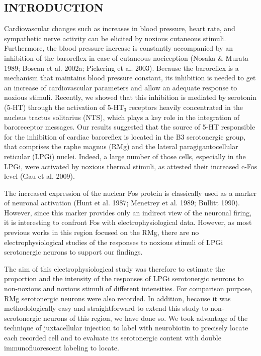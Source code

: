 \documentclass[a4paper,12pt,twoside]{report}
\begin{document}
\vfill

\cleardoublepage

\subsection{INTRODUCTION}

Cardiovascular changes such as increases in blood pressure, heart rate, and sympathetic nerve activity can be elicited by noxious cutaneous stimuli. Furthermore, the blood pressure increase is constantly accompanied by an inhibition of the baroreflex in case of cutaneous nociception (Nosaka \& Murata 1989; Boscan et al. 2002a; Pickering et al. 2003). Because the baroreflex is a mechanism that maintains blood pressure constant, its inhibition is needed to get an increase of cardiovascular parameters and allow an adequate response to noxious stimuli. Recently, we showed that this inhibition is mediated by serotonin (5-HT) through the activation of 5-HT$_{3}$ receptors heavily concentrated in the nucleus tractus solitarius (NTS), which plays a key role in the integration of baroreceptor messages. Our results suggested that the source of 5-HT responsible for the inhibition of cardiac baroreflex is located in the B3 serotonergic group, that comprises the raphe magnus (RMg) and the lateral paragigantocellular reticular (LPGi) nuclei. Indeed, a large number of those cells, especially in the LPGi, were activated by noxious thermal stimuli, as attested their increased c-Fos level (Gau et al. 2009).

The increased expression of the nuclear Fos protein is classically used as a marker of neuronal activation (Hunt et al. 1987; Menetrey et al. 1989; Bullitt 1990). However, since this marker provides only an indirect view of the neuronal firing, it is interesting to confront Fos with electrophysiological data. However, as most previous works in this region focused on the RMg, there are no electrophysiological studies of the responses to noxious stimuli of LPGi serotonergic neurons to support our findings.

The aim of this electrophysiological study was therefore to estimate the proportion and the intensity of the responses of LPGi serotonergic neurons to non-noxious and noxious stimuli of different intensities. For comparison purpose, RMg serotonergic neurons were also recorded. In addition, because it was methodologically easy and straightforward to extend this study to non-serotonergic neurons of this region, we have done so. We took advantage of the technique of juxtacellular injection to label with neurobiotin to precisely locate each recorded cell and to evaluate its serotonergic content with double immunofluorescent labeling to locate. 
\end{document}
